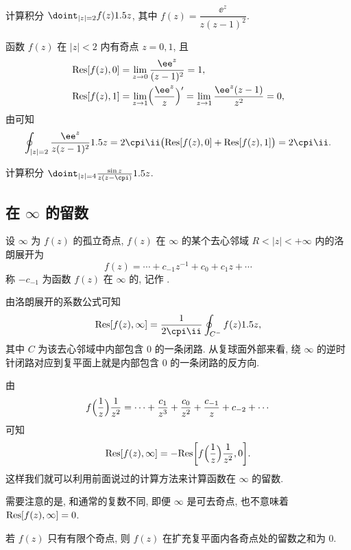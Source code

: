 \begin{example}
  计算积分 $\doint_{|z|=2}f(z)\d z$, 其中 $f(z)=\dfrac{\ee^z}{z(z-1)^2}$.
\end{example}

\begin{solution}
  函数 $f(z)$ 在 $|z|<2$ 内有奇点 $z=0,1$, 且
  \begin{align*}
     \Res[f(z),0]&
    =\lim_{z\ra0}\frac{\ee^z}{(z-1)^2}
    =1,\\
     \Res[f(z),1]&
    =\lim_{z\ra1}\Bigl(\frac{\ee^z}z\Bigr)'
    =\lim_{z\ra1}\frac{\ee^z(z-1)}{z^2}
    =0,
  \end{align*}
  由\thmRes 可知
  \[
    \oint_{|z|=2}\frac{\ee^z}{z(z-1)^2}\d z
    =2\cpi\ii\bigl(\Res[f(z),0]+\Res[f(z),1]\bigr)
    =2\cpi\ii.
  \]
\end{solution}

\begin{exercise}
  计算积分 $\doint_{|z|=4}\frac{\sin z}{z(z-\cpi)}\d z$.
\end{exercise}


\subsection{在 \texorpdfstring{$\infty$}{∞} 的留数}

\begin{definition}
  设 $\infty$ 为 $f(z)$ 的孤立奇点, $f(z)$ 在 $\infty$ 的某个去心邻域 $R<|z|<+\infty$ 内的洛朗展开为
  \[
    f(z)=\cdots+c_{-1}z^{-1}+c_0+c_1z+\cdots
  \]
  称 $-c_{-1}$ 为函数 $f(z)$ 在 $\infty$ 的, 记作 \noun{$\Res[f(z),\infty]$}.
\end{definition}

由洛朗展开的系数公式可知
\[
  \Res[f(z),\infty]=\frac1{2\cpi\ii}\oint_{C^-}f(z)\d z,
\]
其中 $C$ 为该去心邻域中内部包含 $0$ 的一条闭路.
从复球面外部来看, 绕 $\infty$ 的逆时针闭路对应到复平面上就是内部包含 $0$ 的一条闭路的反方向.

由
\[
   f\Bigl(\frac1z\Bigr)\frac1{z^2}
  =\cdots+\frac{c_1}{z^3}+\frac{c_0}{z^2}+\frac{c_{-1}}z+c_{-2}+\cdots
\]
可知 
\[
   {\mathrm{Res}}[f(z),\infty]
  =-{\mathrm{Res}}\biggl[f\Bigl(\frac1z\Bigr)\frac1{z^2},0\biggr].
\]
这样我们就可以利用前面说过的计算方法来计算函数在 $\infty$ 的留数.

需要注意的是, 和通常的复数不同, \alert{即便 $\infty$ 是可去奇点, 也不意味着 ${\mathrm{Res}}[f(z),\infty]=0$}.

\begin{theorem}\label{thm:sum-of-residues-are-zero}
  若 $f(z)$ 只有有限个奇点, 则 $f(z)$ 在扩充复平面内各奇点处的留数之和为 $0$.
\end{theorem}

